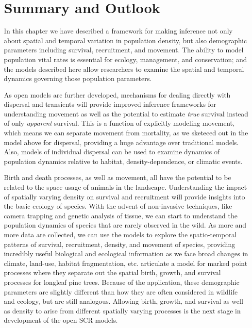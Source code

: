 \section{Summary and Outlook}

In this chapter we have described a framework for making inference not
only about spatial and temporal variation in population density, but
also demographic parameters including survival, recruitment, and
movement. The ability to model population vital rates is essential for
ecology, management, and conservation; and the models described here
allow researchers to examine the spatial and temporal dynamics
governing those population parameters.

As open models are further developed, mechanisms for dealing directly
with dispersal and transients will provide improved inference
frameworks for understanding movement as well as the potential to
estimate {\it true} survival instead of only {\it apparent} survival.
This is a function of explicitly modeling movement, which means we can
separate movement from mortality, as we sketeced out in the model
above for dispersal, providing a huge advantage over traditional
models.  Also, models of individual dispersal can be used to examine
dynamics of population dynamics relative to habitat,
density-dependence, or climatic events.

Birth and death processes, as well as movement, all have the potential
to be related to the space usage of animals in the landscape.
Understanding the impact of spatially varying density on survival and
recruitment will provide insights into the basic ecology of species.
With the advent of non-invasive techniques, like camera trapping and
genetic analysis of tissue, we can start to understand the population
dynamics of species that are rarely observed in the wild.  As more and
more data are collected, we can use the models to explore the
spatio-temporal patterns of survival, recruitment, density, and
movement of species, providing incredibly useful biological and
ecological information as we face broad changes in climate, land-use,
habitat fragmentation, etc.  \citet{rathbun_cressie:1994} articulate a
model for marked point processes where they separate out the spatial
birth, growth, and survival processes for longleaf pine trees.
Because of the application, these demographic parameters are slightly
different than how they are often considered in wildlife and ecology,
but are still analogous.  Allowing birth, growth, and survival as well
as density to arise from different spatially varying processes is the
next stage in development of the open SCR models.


